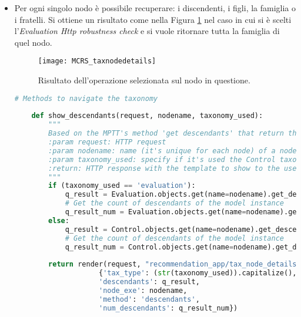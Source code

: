 \begin{itemize}
    \item Per ogni singolo nodo è possibile recuperare: i discendenti, i figli, la famiglia o i fratelli. Si ottiene un risultato come nella 
    Figura \ref{fig:MCRS_taxnodedetails} nel caso in cui si è scelti l'\textit{Evaluation Http robustness check} e si vuole ritornare tutta la 
    famiglia di quel nodo.
    \begin{figure}[ht!]
        \centering
        \texttt{[image: MCRS\_taxnodedetails]}
        \caption[Risultato dell'operazione selezionata sul nodo in questione]{Risultato dell'operazione selezionata sul nodo in questione.}
        \label{fig:MCRS_taxnodedetails}
    \end{figure}
    \lstset{style=python_code_style}
    \begin{lstlisting}[language=Python, label=lst:view_tax_nodedetails, caption={Codice utilizzato all'interno delle View per 
        implementare le operazioni per restituire i discendenti, i figli, la famiglia o i fratelli.}]
    # Methods to navigate the taxonomy
 
    def show_descendants(request, nodename, taxonomy_used):
        """
        Based on the MPTT's method 'get descendants' that return the descendants of a model instance, in tree order
        :param request: HTTP request
        :param nodename: name (it's unique for each node) of a node in the taxonomy
        :param taxonomy_used: specify if it's used the Control taxonomy or the Evaluation taxonomy
        :return: HTTP response with the template to show to the user
        """
        if (taxonomy_used == 'evaluation'):
            q_result = Evaluation.objects.get(name=nodename).get_descendants(include_self=False)
            # Get the count of descendants of the model instance
            q_result_num = Evaluation.objects.get(name=nodename).get_descendant_count()
        else:
            q_result = Control.objects.get(name=nodename).get_descendants(include_self=False)
            # Get the count of descendants of the model instance
            q_result_num = Control.objects.get(name=nodename).get_descendant_count()
 
        return render(request, "recommendation_app/tax_node_details.html",
                    {'tax_type': (str(taxonomy_used)).capitalize(),
                    'descendants': q_result,
                    'node_exe': nodename,
                    'method': 'descendants',
                    'num_descendants': q_result_num})
 

\end{lstlisting}
\end{itemize}
